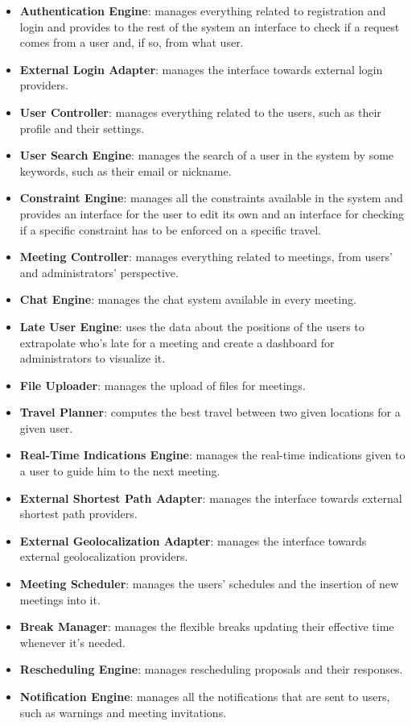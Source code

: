 \begin{itemize}
\item \textbf{Authentication Engine}: manages everything related to registration and login and provides to the rest of the system an interface to check if a request comes from a user and, if so, from what user.
\item \textbf{External Login Adapter}: manages the interface towards external login providers.
\item \textbf{User Controller}: manages everything related to the users, such as their profile and their settings.
\item \textbf{User Search Engine}: manages the search of a user in the system by some keywords, such as their email or nickname.
\item \textbf{Constraint Engine}: manages all the constraints available in the system and provides an interface for the user to edit its own and an interface for checking if a specific constraint has to be enforced on a specific travel.
\item \textbf{Meeting Controller}: manages everything related to meetings, from users' and administrators' perspective.
\item \textbf{Chat Engine}: manages the chat system available in every meeting.
\item \textbf{Late User Engine}: uses the data about the positions of the users to extrapolate who's late for a meeting and create a dashboard for administrators to visualize it.
\item \textbf{File Uploader}: manages the upload of files for meetings.
\item \textbf{Travel Planner}: computes the best travel between two given locations for a given user.
\item \textbf{Real-Time Indications Engine}: manages the real-time indications given to a user to guide him to the next meeting.
\item \textbf{External Shortest Path Adapter}: manages the interface towards external shortest path providers.
\item \textbf{External Geolocalization Adapter}: manages the interface towards external geolocalization providers.
\item \textbf{Meeting Scheduler}: manages the users' schedules and the insertion of new meetings into it.
\item \textbf{Break Manager}: manages the flexible breaks updating their effective time whenever it's needed.
\item \textbf{Rescheduling Engine}: manages rescheduling proposals and their responses.
\item \textbf{Notification Engine}: manages all the notifications that are sent to users, such as warnings and meeting invitations.
\end{itemize}

\clearpage